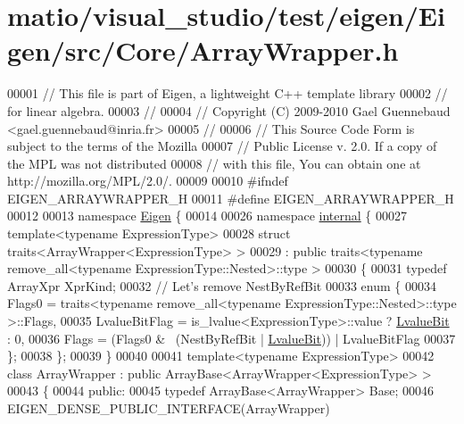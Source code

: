 \hypertarget{matio_2visual__studio_2test_2eigen_2_eigen_2src_2_core_2_array_wrapper_8h_source}{}\section{matio/visual\+\_\+studio/test/eigen/\+Eigen/src/\+Core/\+Array\+Wrapper.h}
\label{matio_2visual__studio_2test_2eigen_2_eigen_2src_2_core_2_array_wrapper_8h_source}

\begin{DoxyCode}
00001 \textcolor{comment}{// This file is part of Eigen, a lightweight C++ template library}
00002 \textcolor{comment}{// for linear algebra.}
00003 \textcolor{comment}{//}
00004 \textcolor{comment}{// Copyright (C) 2009-2010 Gael Guennebaud <gael.guennebaud@inria.fr>}
00005 \textcolor{comment}{//}
00006 \textcolor{comment}{// This Source Code Form is subject to the terms of the Mozilla}
00007 \textcolor{comment}{// Public License v. 2.0. If a copy of the MPL was not distributed}
00008 \textcolor{comment}{// with this file, You can obtain one at http://mozilla.org/MPL/2.0/.}
00009 
00010 \textcolor{preprocessor}{#ifndef EIGEN\_ARRAYWRAPPER\_H}
00011 \textcolor{preprocessor}{#define EIGEN\_ARRAYWRAPPER\_H}
00012 
00013 \textcolor{keyword}{namespace }\hyperlink{namespace_eigen}{Eigen} \{ 
00014 
00026 \textcolor{keyword}{namespace }\hyperlink{namespaceinternal}{internal} \{
00027 \textcolor{keyword}{template}<\textcolor{keyword}{typename} ExpressionType>
00028 \textcolor{keyword}{struct }traits<ArrayWrapper<ExpressionType> >
00029   : \textcolor{keyword}{public} traits<typename remove\_all<typename ExpressionType::Nested>::type >
00030 \{
00031   \textcolor{keyword}{typedef} ArrayXpr XprKind;
00032   \textcolor{comment}{// Let's remove NestByRefBit}
00033   \textcolor{keyword}{enum} \{
00034     Flags0 = traits<typename remove\_all<typename ExpressionType::Nested>::type >::Flags,
00035     LvalueBitFlag = is\_lvalue<ExpressionType>::value ? \hyperlink{group__flags_gae2c323957f20dfdc6cb8f44428eaec1a}{LvalueBit} : 0,
00036     Flags = (Flags0 & ~(NestByRefBit | \hyperlink{group__flags_gae2c323957f20dfdc6cb8f44428eaec1a}{LvalueBit})) | LvalueBitFlag
00037   \};
00038 \};
00039 \}
00040 
00041 \textcolor{keyword}{template}<\textcolor{keyword}{typename} ExpressionType>
00042 \textcolor{keyword}{class }ArrayWrapper : \textcolor{keyword}{public} ArrayBase<ArrayWrapper<ExpressionType> >
00043 \{
00044   \textcolor{keyword}{public}:
00045     \textcolor{keyword}{typedef} ArrayBase<ArrayWrapper> Base;
00046     EIGEN\_DENSE\_PUBLIC\_INTERFACE(ArrayWrapper)

\end{DoxyCode}
